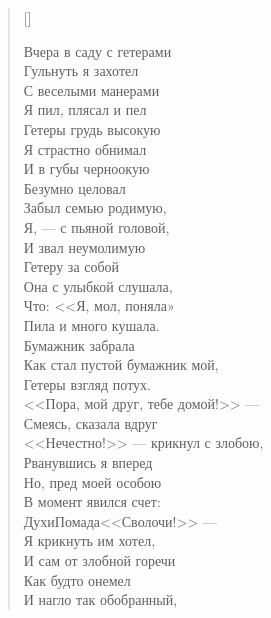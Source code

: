 \newpage
\vspace*{0cm}


\settowidth{\versewidth}{Вчера в саду с гетерами}
\begin{verse}[\versewidth]
\begin{altverse}
Вчера в саду с гетерами\\
     Гульнуть я захотел\ldotst\\
С веселыми манерами\\
     Я пил, плясал и пел\ldotst\\
Гетеры грудь высокую\\
     Я страстно обнимал\\
И в губы черноокую\\
     Безумно целовал\ldotst\\
Забыл семью родимую,\\
     Я, --- с пьяной головой,\\
И звал неумолимую\\
     Гетеру за собой\ldotst\\
Она с улыбкой слушала,\\
     Что: <<Я, мол, поняла»\ldotst\\
Пила и много кушала.\\
     Бумажник забрала\ldotst\\
Как стал пустой бумажник мой,\\
     Гетеры взгляд потух.\\
<<Пора, мой друг, тебе домой!>> ---\\
      Смеясь, сказала вдруг\ldotst\\
<<Нечестно!>> --- крикнул с злобою,\\
     Рванувшись я вперед\ldotst\\
Но, пред моей особою\\
     В момент явился счет:\\
Духи\ldotst Помада\ldotst <<Сволочи!>> ---\\
     Я крикнуть им хотел,\\
И сам от злобной горечи\\
     Как будто онемел\ldotst\\
И нагло так обобранный,\\

\end{altverse}
\end{verse}
